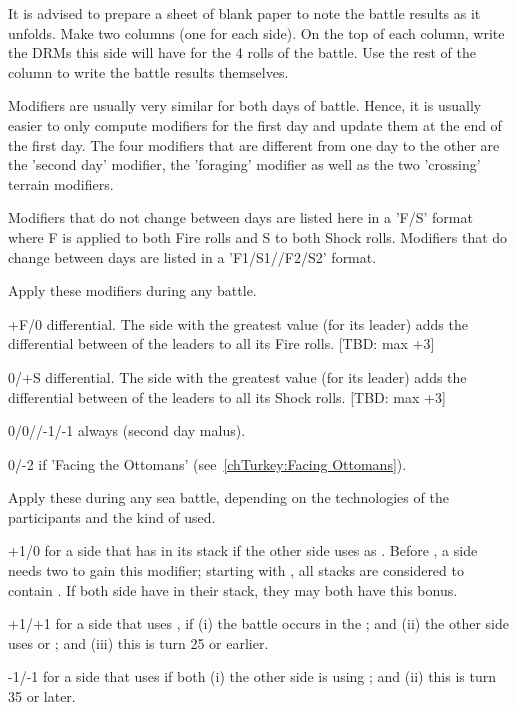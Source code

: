 \begin{playtip}
  It is advised to prepare a sheet of blank paper to note the battle results
  as it unfolds. Make two columns (one for each side). On the top of each
  column, write the DRMs this side will have for the 4 rolls of the
  battle. Use the rest of the column to write the battle results themselves.

  Modifiers are usually very similar for both days of battle. Hence, it is
  usually easier to only compute modifiers for the first day and update them
  at the end of the first day. The four modifiers that are different from one
  day to the other are the 'second day' modifier, the 'foraging' modifier as
  well as the two 'crossing' terrain modifiers.
\end{playtip}

Modifiers that do not change between days are listed here in a 'F/S' format
where F is applied to both Fire rolls and S to both Shock rolls. Modifiers
that do change between days are listed in a 'F1/S1//F2/S2' format.

 Apply these modifiers during any battle.
\begin{modlist}
\item[+F/0] \Fire differential. The side with the greatest \Fire value (for its
  leader) adds the differential between \Fire of the leaders to all its Fire
  rolls. [TBD: max +3]
\item[0/+S] \Shock differential. The side with the greatest \Shock value (for
  its leader) adds the differential between \Shock of the leaders to all its
  Shock rolls. [TBD: max +3]
\item[0/0//-1/-1] always (second day malus).
\item[0/-2] if 'Facing the Ottomans' (see~\ref{chTurkey:Facing Ottomans}).
\end{modlist}

 Apply these during any sea battle,
depending on the technologies of the participants and the kind of  used.
\begin{modlist}
\item[+1/0] for a side that has \VGD in its stack if the other side uses \NGD
  as . Before \TBAT, a side needs two \VGD to gain
  this modifier; starting with \TBAT, all \NGD stacks are considered to
  contain \VGD. If both side have \VGD in their stack, they may both have
  this bonus.
\item[+1/+1] for a side that uses \NGD, if (i) the battle occurs in the
  ; and (ii) the other side uses \NWD or \NTD; and (iii)
  this is turn 25 or earlier.
\item[-1/-1] for a side that uses \NGD if both (i) the other side is using
  \NWD; and (ii) this is turn 35 or later.
\end{modlist}

